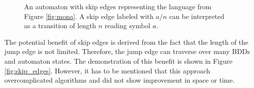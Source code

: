 \documentclass[pdflatex,sn-mathphys-num]{sn-jnl}%
\theoremstyle{thmstyleone}%
\theoremstyle{thmstyletwo}%
\theoremstyle{thmstylethree}%
\begin{document}
        \vspace*{-1em}

        \begin{figure}[h]
            \centering
            \caption{An automaton with skip edges representing the language from Figure \ref{fig:mona}. A skip edge labeled with $a/n$ can be interpreted as a transition of length $n$ reading symbol $a$.}
        \end{figure}

        \vspace*{-1.5em}

        The potential benefit of skip edges is derived from the fact that the length of the jump edge is not limited. Therefore, the jump edge can traverse over many BDDs and automaton states. The demonstration of this benefit is shown in Figure \ref{fig:skip_edges}. However, it has to be mentioned that this approach overcomplicated algorithms and did not show improvement in space or time.

        \vspace*{-1.25em}
\end{document}

